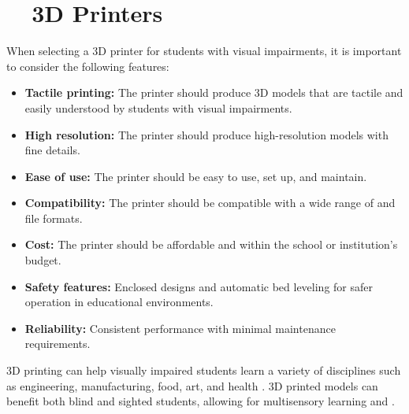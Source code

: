 \section{~~3D Printers}\label{ch5:sec:3d-printers}
When selecting a 3D printer for students with visual impairments, it is important to consider the following features:
\begin{itemize}
	\item \textbf{Tactile printing:} The printer should produce 3D models that are tactile and easily understood by students with visual impairments.
	\item \textbf{High resolution:} The printer should produce high-resolution models with fine details.
	\item \textbf{Ease of use:} The printer should be easy to use, set up, and maintain.
	\item \textbf{Compatibility:} The printer should be compatible with a wide range of  and file formats.
	\item \textbf{Cost:} The printer should be affordable and within the school or institution's budget.
	\item \textbf{Safety features:} Enclosed designs and automatic bed leveling for safer operation in educational environments.
	\item \textbf{Reliability:} Consistent performance with minimal maintenance requirements.
\end{itemize}

3D printing can help visually impaired students learn a variety of disciplines such as engineering, manufacturing, food, art, and health \supercite{Karbowski2020, TeachThought2021}. 3D printed models can benefit both blind and sighted students, allowing for multisensory learning and  \supercite{MatterHackers2017, DassaultEducation}.

